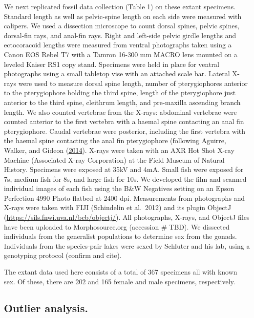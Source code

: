 \documentclass[
  12pt,
]{article}
\begin{document}
We next replicated fossil data collection (Table 1) on these extant
specimens. Standard length as well as pelvic-spine length on each side
were measured with calipers. We used a dissection microscope to count
dorsal spines, pelvic spines, dorsal-fin rays, and anal-fin rays. Right
and left-side pelvic girdle lengths and ectocoracoid lengths were
measured from ventral photographs taken using a Canon EOS Rebel T7 with
a Tamron 16-300 mm MACRO lens mounted on a leveled Kaiser RS1 copy
stand. Specimens were held in place for ventral photographs using a
small tabletop vise with an attached scale bar. Lateral X-rays were used
to measure dorsal spine length, number of pterygiophores anterior to the
pterygiophore holding the third spine, length of the pterygiophore just
anterior to the third spine, cleithrum length, and pre-maxilla ascending
branch length. We also counted vertebrae from the X-rays: abdominal
vertebrae were counted anterior to the first vertebra with a haemal
spine contacting an anal fin pterygiophore. Caudal vertebrae were
posterior, including the first vertebra with the haemal spine contacting
the anal fin pterygiophore (following Aguirre, Walker, and Gideon
(\protect\hyperlink{ref-Aguirre2014}{2014}). X-rays were taken with an
AXR Hot Shot X-ray Machine (Associated X-ray Corporation) at the Field
Museum of Natural History. Specimens were exposed at 35kV and 4mA. Small
fish were exposed for 7s, medium fish for 8s, and large fish for 10s. We
developed the film and scanned individual images of each fish using the
B\&W Negatives setting on an Epson Perfection 4990 Photo flatbed at 2400
dpi. Measurements from photographs and X-rays were taken with FIJI
(Schindelin et al.~2012) and its plugin ObjectJ
(\url{https://sils.fnwi.uva.nl/bcb/objectj/}). All photographs, X-rays,
and ObjectJ files have been uploaded to Morphosource.org (accession \#
TBD). We dissected individuals from the generalist populations to
determine sex from the gonads. Individuals from the species-pair lakes
were sexed by Schluter and his lab, using a genotyping protocol (confirm
and cite).

The extant data used here consists of a total of 367 specimens all with
known sex. Of these, there are 202 and 165 female and male specimens,
respectively.

\hypertarget{outlier-analysis.}{%
\subsection{Outlier analysis.}\label{outlier-analysis.}}
\end{document}
